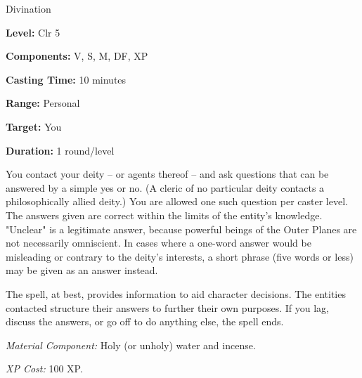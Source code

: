
Divination

\textbf{Level:} Clr 5

\textbf{Components:} V, S, M, DF, XP

\textbf{Casting Time:} 10 minutes

\textbf{Range:} Personal

\textbf{Target:} You

\textbf{Duration:} 1 round/level

You contact your deity -- or agents thereof  -- and ask questions that can be answered 
by a simple yes or no. (A cleric of no particular deity contacts a philosophically 
allied deity.) You are allowed one such question per caster level. The answers 
given are correct within the limits of the entity's knowledge. "Unclear" is a 
legitimate answer, because powerful beings of the Outer Planes are not necessarily 
omniscient. In cases where a one-word answer would be misleading or contrary to 
the deity's interests, a short phrase (five words or less) may be given as an answer 
instead.

The spell, at best, provides information to aid character decisions. The entities 
contacted structure their answers to further their own purposes. If you lag, discuss 
the answers, or go off to do anything else, the spell ends.

\textit{Material Component:} Holy (or unholy) water and incense.

\textit{XP Cost:} 100 XP.

